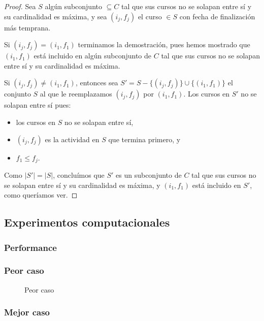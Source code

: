 \documentclass[a4paper, 10pt, twoside]{article}
\newcommand{\tresgraficos}[3]{
    \newcommand{\separacion}{-2.2em}
    \vspace{\separacion}
    
    \vspace{\separacion}
    
    \vspace{\separacion}
    
}
\begin{document}
\begin{proof}
    Sea $S$ algún subconjunto $\subseteq C$ tal que sus cursos no se solapan entre sí y su cardinalidad es máxima, y sea $(i_j, f_j)$ el curso $\in S$ con fecha de finalización más temprana.

    Si $(i_j, f_j) = (i_1, f_1)$ terminamos la demostración, pues hemos mostrado que $(i_1, f_1)$ está incluido en algún subconjunto de $C$ tal que sus cursos no se solapan entre sí y su cardinalidad es máxima.

    Si $(i_j, f_j) \neq (i_1, f_1)$, entonces sea $S' = S - \{ (i_j, f_j) \} \cup \{ (i_1, f_1) \}$ el conjunto $S$ al que le reemplazamos $(i_j, f_j)$ por $(i_1, f_1)$. Los cursos en $S'$ no se solapan entre sí pues:

    \begin{itemize}[nolistsep]
        \item{los cursos en $S$ no se solapan entre sí,}
        \item{$(i_j, f_j)$ es la actividad en $S$ que termina primero, y}
        \item{$f_1 \leq f_j$.}
    \end{itemize}

    Como $|S'| = |S|$, concluímos que $S'$ es un subconjunto de $C$ tal que sus cursos no se solapan entre sí y su cardinalidad es máxima, y $(i_1, f_1)$ está incluido en $S'$, como queríamos ver.
\end{proof}

\subsection{Experimentos computacionales}

\subsubsection{Performance}


\subsubsection{Peor caso}

\begin{figure}[H]
  \centering
  \tresgraficos{problema2-peor-caso}
               {problema2-peor-caso-logn}
               {problema2-peor-caso-n}               
  \caption{Peor caso}
\end{figure}


\subsubsection{Mejor caso}
\end{document}

